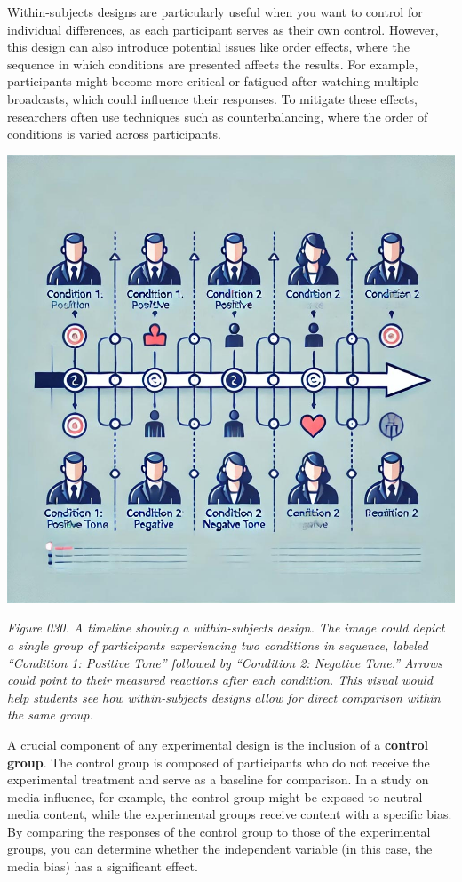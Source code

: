 \documentclass[
]{book}
\begin{document}
Within-subjects designs are particularly useful when you want to control for individual differences, as each participant serves as their own control. However, this design can also introduce potential issues like order effects, where the sequence in which conditions are presented affects the results. For example, participants might become more critical or fatigued after watching multiple broadcasts, which could influence their responses. To mitigate these effects, researchers often use techniques such as counterbalancing, where the order of conditions is varied across participants.

\includegraphics[width=1\linewidth,height=\textheight,keepaspectratio]{images/fig030.jpg}

\emph{Figure 030. A timeline showing a within-subjects design. The image could depict a single group of participants experiencing two conditions in sequence, labeled ``Condition 1: Positive Tone'' followed by ``Condition 2: Negative Tone.'' Arrows could point to their measured reactions after each condition. This visual would help students see how within-subjects designs allow for direct comparison within the same group.}

A crucial component of any experimental design is the inclusion of a \textbf{control group}. The control group is composed of participants who do not receive the experimental treatment and serve as a baseline for comparison. In a study on media influence, for example, the control group might be exposed to neutral media content, while the experimental groups receive content with a specific bias. By comparing the responses of the control group to those of the experimental groups, you can determine whether the independent variable (in this case, the media bias) has a significant effect.
\end{document}

